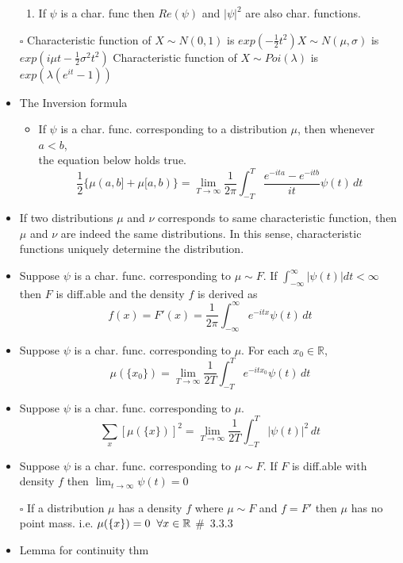 \documentclass[12pt, A4]{article}
\begin{document}
\begin{itemize}
\begin{enumerate}
		\item If $\psi$ is a char. func then $Re(\psi)$ and $|\psi|^2$ are also char. functions.
	\end{enumerate}
	\item[$\square$] Characteristic function of $X\sim N(0,1)$ is $exp(-\frac{1}{2}t^2)$\quad  $X\sim N(\mu, \sigma)$ is $exp(i\mu t-\frac{1}{2}\sigma^2 t^2)$
	\newline Characteristic function of $X\sim Poi(\lambda)$ is $exp(\lambda(e^{it}-1))$
\clearpage
	\item The Inversion formula
	\begin{itemize}
		\item If $\psi$ is a char. func. corresponding to a distribution $\mu$, then whenever $a<b$,\\ the equation below holds true. 
		\[\frac{1}{2}\{\mu(a,b]+\mu[a,b)\}=\lim_{T \to \infty}\frac{1}{2\pi}\int_{-T}^{T} \frac{e^{-ita}-e^{-itb}}{it}\psi(t)\,dt \]
	\end{itemize}
	\item If two distributions $\mu$ and $\nu$ corresponds to same characteristic function, then $\mu$ and $\nu$ are indeed the same distributions. In this sense, characteristic functions uniquely determine the distribution.
	\item Suppose $\psi$ is a char. func. corresponding to $\mu\sim F$. \newline If $\int_{-\infty}^{\infty}|\psi(t)|dt<\infty$ then $F$ is diff.able and the density $f$ is derived as \[f(x)=F'(x)=\frac{1}{2\pi}\int_{-\infty}^{\infty}e^{-itx}\psi(t)\,dt\]
	\item Suppose $\psi$ is a char. func. corresponding to $\mu$. For each $x_0\in \mathbb{R}$, $$\mu(\{x_0\})=\lim_{T \to \infty}\frac{1}{2T}\int_{-T}^{T}e^{-itx_0}\psi(t)\,dt$$
	\item Suppose $\psi$ is a char. func. corresponding to $\mu$.
	$$\sum_{x}{[\mu(\{x\})]^2}=\lim_{T \to \infty}\frac{1}{2T}\int_{-T}^{T}|\psi(t)|^2\,dt$$
	\item Suppose $\psi$ is a char. func. corresponding to $\mu\sim F$. If $F$ is diff.able with density $f$ then $\lim_{t \to \infty} \psi(t)=0$
	\item[$\square$] If a distribution $\mu$ has a density $f$ where $\mu\sim F$ and $f=F'$ then $\mu$ has no point mass. i.e.\hspace{0.2cm} $\mu(\{x\})=0 \hspace{0.2cm} \forall x\in \mathbb{R}$ \quad \#\ 3.3.3
	\item Lemma for continuity thm

\end{itemize}
\end{document}
